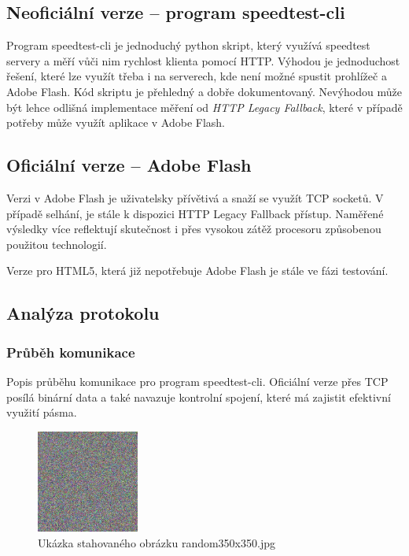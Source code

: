 \documentclass[12pt,a4paper]{article}
\begin{document}
\subsection{Neoficiální verze -- program speedtest-cli}

Program speedtest-cli je jednoduchý python skript, který využívá speedtest servery a měří vůči nim rychlost klienta pomocí HTTP. Výhodou je jednoduchost řešení, které lze využít třeba i na serverech, kde není možné spustit prohlížeč a Adobe Flash. Kód skriptu je přehledný a dobře dokumentovaný. Nevýhodou může být lehce odlišná implementace měření od \textit{HTTP Legacy Fallback}, které v případě potřeby může využít aplikace v Adobe Flash.


\subsection{Oficiální verze -- Adobe Flash}

Verzi v Adobe Flash je uživatelsky přívětivá a snaží se využít TCP socketů. V případě selhání, je stále k dispozici HTTP Legacy Fallback přístup. Naměřené výsledky více reflektují skutečnost i přes vysokou zátěž procesoru způsobenou použitou technologií.

Verze pro HTML5, která již nepotřebuje Adobe Flash je stále ve fázi testování.


\subsection{Analýza protokolu}

\subsubsection{Průběh komunikace}

Popis průběhu komunikace pro program speedtest-cli. Oficiální verze přes TCP posílá binární data a také navazuje kontrolní spojení, které má zajistit efektivní využití pásma.

\begin{figure}[h]
\centering
\includegraphics[width=0.3\textwidth]{random350x350.jpg}
\caption{Ukázka stahovaného obrázku random350x350.jpg}
\label{random350}
\end{figure}
\end{document}
